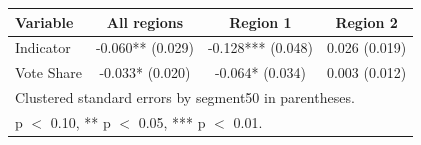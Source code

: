 \begin{tabular}{lccc}
\hline\hline
Variable & All regions & Region 1 & Region 2 \\
\hline
Indicator & -0.060** (0.029) & -0.128*** (0.048) & 0.026 (0.019) \\
Vote Share & -0.033* (0.020) & -0.064* (0.034) & 0.003 (0.012) \\
\hline
\multicolumn{4}{l}{\footnotesize Clustered standard errors by segment50 in parentheses.} \\
\multicolumn{4}{l}{\footnotesize * p $<$ 0.10, ** p $<$ 0.05, *** p $<$ 0.01.} \\
\hline\hline
\end{tabular}
